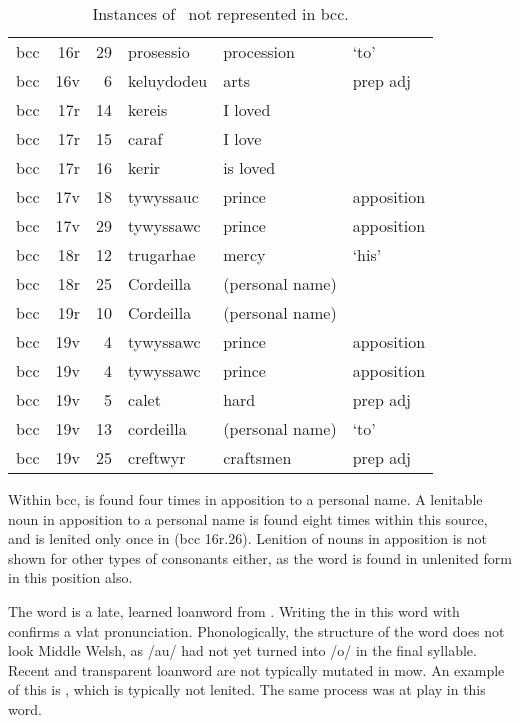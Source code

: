 \begin{table}[h]
  \centering
  \begin{tabular}{lddwql}
    \toprule
     &  &  &  &  &  \\
    \midrule
    \gls{bcc} & 16r & 29 & prosessio & procession &  ‘to' \\
    \gls{bcc} & 16v & 6 & keluydodeu & arts & prep adj \\
    \gls{bcc} & 17r & 14 & kereis & I loved &  \\
    \gls{bcc} & 17r & 15 & caraf & I love &  \\
    \gls{bcc} & 17r & 16 & kerir & is loved &  \\
    \gls{bcc} & 17v & 18 & tywyssauc & prince & apposition \\
    \gls{bcc} & 17v & 29 & tywyssawc & prince & apposition \\
    \gls{bcc} & 18r & 12 & trugarhae & mercy &  ‘his' \\
    \gls{bcc} & 18r & 25 & Cordeilla & (personal name) &  \\
    \gls{bcc} & 19r & 10 & Cordeilla & (personal name) &  \\
    \gls{bcc} & 19v & 4 & tywyssawc & prince & apposition \\
    \gls{bcc} & 19v & 4 & tywyssawc & prince & apposition \\
    \gls{bcc} & 19v & 5 & calet & hard & prep adj \\
    \gls{bcc} & 19v & 13 & cordeilla & (personal name) &  ‘to' \\
    \gls{bcc} & 19v & 25 & creftwyr & craftsmen & prep adj \\
    \bottomrule
  \end{tabular}%
  \caption{Instances of \lT\ not represented in \acrshort{bcc}.}
  \label{tab:ltnotrepbcc}
\end{table}

Within \gls{bcc},  is found four times in apposition to a personal name.
A lenitable noun in apposition to a personal name is found eight times within this source, and is lenited only once in  (\gls{bcc} 16r.26).
Lenition of nouns in apposition is not shown for other types of consonants either, as the word  is found in unlenited form in this position also.

The word  is a late, learned loanword from .
Writing the  in this word with  confirms a \gls{vlat} pronunciation.
Phonologically, the structure of the word does not look Middle Welsh, as /au/ had not yet turned into /o/ in the final syllable.
Recent and transparent loanword are not typically mutated in \gls{mow}.
An example of this is , which is typically not lenited.
The same process was at play in this word.

